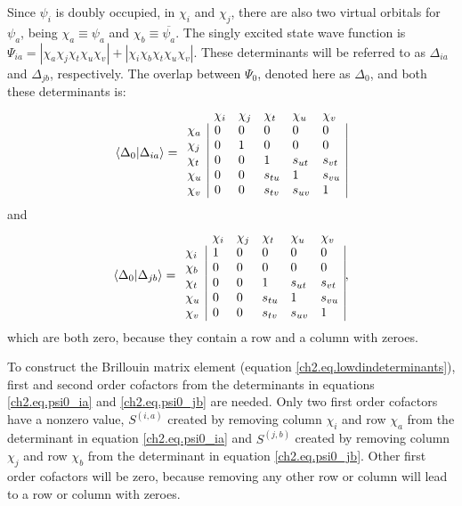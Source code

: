 Since $\psi_i$ is doubly occupied, in $\chi_i$ and $\chi_j$, there are also two virtual orbitals for $\psi_a$, being $\chi_a \equiv \psi_a$ and $\chi_b \equiv \overline{\psi_a}$. The singly excited state wave function is $\Psi_{ia} = |\chi_a\chi_j\chi_t\chi_u\chi_v| + |\chi_i\chi_b\chi_t\chi_u\chi_v|$. These determinants will be referred to as $\Delta_{ia}$ and $\Delta_{jb}$, respectively. The overlap between $\Psi_0$, denoted here as $\Delta_0$, and both these determinants is:
\begin{equation}
\left < \Delta_0 | \Delta_{ia} \right > = 
\begin{array}{llllll}
 &  \chi_i & \chi_j & \chi_t & \chi_u & \chi_v \\
 \chi_a & \multicolumn{1}{|l}{ 0 } & 0 & 0 & 0 & \multicolumn{1}{l|}{ 0 } \\
 \chi_j & \multicolumn{1}{|l}{ 0 } & 1 & 0 & 0 & \multicolumn{1}{l|}{ 0 } \\
 \chi_t & \multicolumn{1}{|l}{ 0 } & 0 & 1 & s_{ut} & \multicolumn{1}{l|}{s_{vt}} \\
 \chi_u & \multicolumn{1}{|l}{ 0 } & 0 & s_{tu} & 1 & \multicolumn{1}{l|}{s_{vu}} \\
 \chi_v & \multicolumn{1}{|l}{ 0 } & 0 & s_{tv} & s_{uv} & \multicolumn{1}{l|}{1}
\end{array}
\label{ch2.eq.psi0_ia}
\end{equation}
and
\begin{equation}
\left < \Delta_0 | \Delta_{jb} \right > = 
\begin{array}{llllll}
 &  \chi_i & \chi_j & \chi_t & \chi_u & \chi_v \\
 \chi_i & \multicolumn{1}{|l}{ 1 } & 0 & 0 & 0 & \multicolumn{1}{l|}{ 0 } \\
 \chi_b & \multicolumn{1}{|l}{ 0 } & 0 & 0 & 0 & \multicolumn{1}{l|}{ 0 } \\
 \chi_t & \multicolumn{1}{|l}{ 0 } & 0 & 1 & s_{ut} & \multicolumn{1}{l|}{s_{vt}} \\
 \chi_u & \multicolumn{1}{|l}{ 0 } & 0 & s_{tu} & 1 & \multicolumn{1}{l|}{s_{vu}} \\
 \chi_v & \multicolumn{1}{|l}{ 0 } & 0 & s_{tv} & s_{uv} & \multicolumn{1}{l|}{1}
\end{array},
\label{ch2.eq.psi0_jb}
\end{equation}
which are both zero, because they contain a row and a column with zeroes.

To construct the Brillouin matrix element (equation \ref{ch2.eq.lowdindeterminants}), first and second order cofactors from the determinants in equations \ref{ch2.eq.psi0_ia} and \ref{ch2.eq.psi0_jb} are needed. Only two first order cofactors have a nonzero value, $S^{(i,a)}$ created by removing column $\chi_i$ and row $\chi_a$ from the determinant in equation \ref{ch2.eq.psi0_ia} and $S^{(j,b)}$ created by removing column $\chi_j$ and row $\chi_b$ from the determinant in equation \ref{ch2.eq.psi0_jb}. Other first order cofactors will be zero, because removing any other row or column will lead to a row or column with zeroes.

